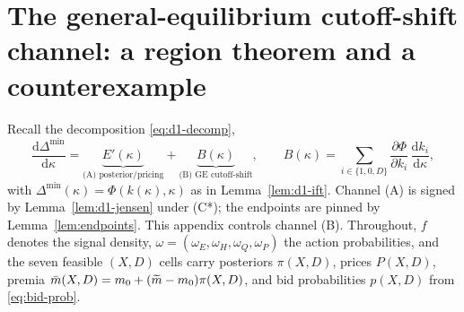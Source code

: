 %

\makeatletter
{}
\makeatother

\section{The general-equilibrium cutoff-shift channel: a region theorem and a counterexample}
\label{app:d8}

Recall the decomposition \eqref{eq:d1-decomp},
\[
\frac{\mathrm{d}\Delta^{\min}}{\mathrm{d}\kappa}
= \underbrace{E'(\kappa)}_{\text{(A) posterior/pricing}}
+ \underbrace{B(\kappa)}_{\text{(B) GE cutoff-shift}},
\qquad
B(\kappa)=\sum_{i\in\{1,0,D\}}\frac{\partial\Phi}{\partial k_i}\,\frac{\mathrm{d} k_i}{\mathrm{d}\kappa},
\]
with $\Delta^{\min}(\kappa)=\Phi(k(\kappa),\kappa)$ as in Lemma~\ref{lem:d1-ift}. Channel (A) is signed by Lemma~\ref{lem:d1-jensen} under \textup{(C*)}; the endpoints are pinned by Lemma~\ref{lem:endpoints}. This appendix controls channel (B). Throughout, $f$ denotes the signal density, $\omega=(\omega_E,\omega_H,\omega_Q,\omega_P)$ the action probabilities, and the seven feasible $(X,D)$ cells carry posteriors $\pi(X,D)$, prices $P(X,D)$, premia $\bar m(X,D)=m_0+(\widetilde{m}-m_0)\pi(X,D)$, and bid probabilities $p(X,D)$ from \eqref{eq:bid-prob}.

